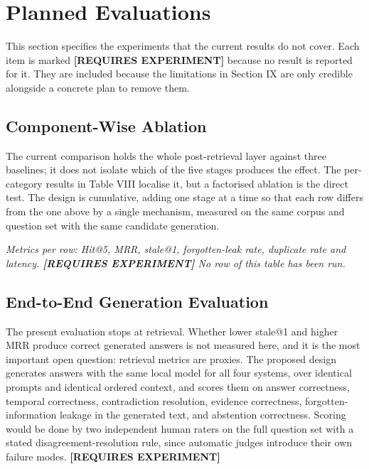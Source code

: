 \documentclass[conference]{IEEEtran}
\begin{document}
\section{Planned Evaluations}
This section specifies the experiments that the current results do not cover. Each item is marked \textbf{[REQUIRES EXPERIMENT]} because no result is reported for it. They are included because the limitations in Section IX are only credible alongside a concrete plan to remove them.
\subsection{Component-Wise Ablation}
The current comparison holds the whole post-retrieval layer against three baselines; it does not isolate which of the five stages produces the effect. The per-category results in Table VIII localise it, but a factorised ablation is the direct test. The design is cumulative, adding one stage at a time so that each row differs from the one above by a single mechanism, measured on the same corpus and question set with the same candidate generation.
\begin{table}[!t]
\caption{Ablation Design}
\label{tab:x}
\centering
{}
\end{table}

\textit{Metrics per row: Hit@5, MRR, stale@1, forgotten-leak rate, duplicate rate and latency. \textbf{[REQUIRES EXPERIMENT]} No row of this table has been run.}
\subsection{End-to-End Generation Evaluation}
The present evaluation stops at retrieval. Whether lower stale@1 and higher MRR produce correct generated answers is not measured here, and it is the most important open question: retrieval metrics are proxies. The proposed design generates answers with the same local model for all four systems, over identical prompts and identical ordered context, and scores them on answer correctness, temporal correctness, contradiction resolution, evidence correctness, forgotten-information leakage in the generated text, and abstention correctness. Scoring would be done by two independent human raters on the full question set with a stated disagreement-resolution rule, since automatic judges introduce their own failure modes. \textbf{[REQUIRES EXPERIMENT]}
\end{document}
